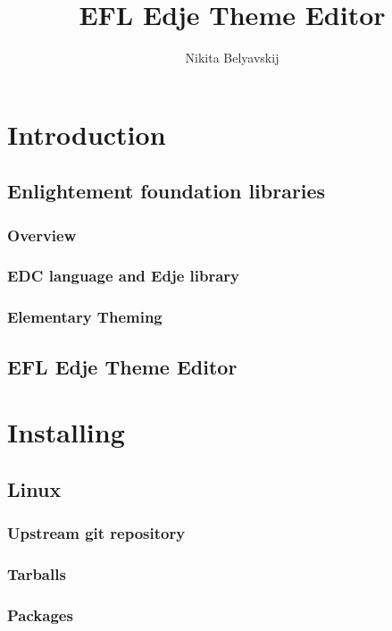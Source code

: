 \documentclass[titlepage,oneside,11pt]{book}
\author{Nikita Belyavskij}
\title{EFL Edje Theme Editor}
\begin{document}
\maketitle
\tableofcontents
\chapter{Introduction}
\section{Enlightement foundation libraries}
\subsection{Overview}
\subsection{EDC language and Edje library}
\subsection{Elementary Theming}
\newpage
\section{EFL Edje Theme Editor}
\chapter{Installing}
\section{Linux}
\subsection{Upstream git repository}
\subsection{Tarballs}
\subsection{Packages}
\newpage
\end{document}
